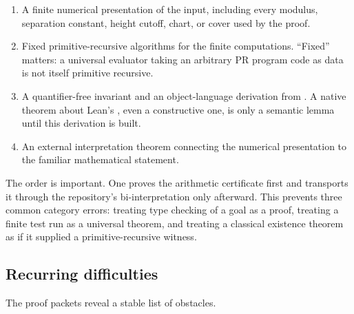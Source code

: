 \begin{enumerate}[label=\textbf{(\arabic*)},leftmargin=2.2em]
\item A finite numerical presentation of the input, including every modulus,
      separation constant, height cutoff, chart, or cover used by the proof.
\item Fixed primitive-recursive algorithms for the finite computations.
      ``Fixed'' matters: a universal evaluator taking an arbitrary PR program
      code as data is not itself primitive recursive.
\item A quantifier-free invariant and an object-language derivation from
      \PRAAx.  A native theorem about Lean's , even a constructive
      one, is only a semantic lemma until this derivation is built.
\item An external interpretation theorem connecting the numerical
      presentation to the familiar mathematical statement.
\end{enumerate}

The order is important.  One proves the arithmetic certificate first and
transports it through the repository's bi-interpretation only afterward.
This prevents three common category errors: treating type checking of a goal
as a proof, treating a finite test run as a universal theorem, and treating a
classical existence theorem as if it supplied a primitive-recursive witness.

\subsection{Recurring difficulties}

The proof packets reveal a stable list of obstacles.

